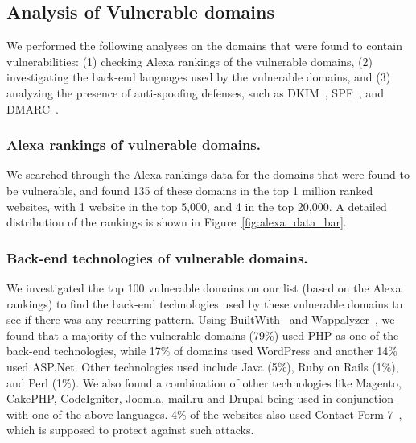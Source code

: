 
\subsection{Analysis of Vulnerable domains}


We performed the following analyses on the domains
that were found to contain \ehi vulnerabilities: (1) checking Alexa
rankings of the vulnerable domains, (2) investigating the back-end
languages used by the vulnerable domains, and (3) analyzing the presence
of anti-spoofing defenses, such as DKIM~\cite{allman2007domainkeys},
SPF~\cite{schlitt2006sender}, and DMARC~\cite{kucherawy2015domain}.



\subsubsection{Alexa rankings of vulnerable domains.}
We searched through the Alexa rankings data\cite{alexa} for the domains that were found to be vulnerable, and found 135 of these domains in the top 1 million ranked websites, with 1 website in the top 5,000, and 4 in the top 20,000. A detailed distribution of the rankings is shown in Figure~\ref{fig:alexa_data_bar}.



\subsubsection{Back-end technologies of vulnerable domains.}
We investigated the top 100 vulnerable domains on our list (based on the Alexa rankings) to find the back-end technologies used by these vulnerable domains to see if there was any recurring pattern. Using BuiltWith~\cite{builtwith} and Wappalyzer~\cite{wappalyzer}, we found that a majority of the vulnerable domains (79\%) used PHP as one of the back-end technologies, while 17\% of domains used WordPress and another 14\% used ASP.Net. Other technologies used include Java (5\%), Ruby on Rails (1\%), and Perl (1\%). We also found a combination of other technologies like Magento, CakePHP, CodeIgniter, Joomla, mail.ru and Drupal being used in conjunction with one of the above languages. 4\% of the websites also used Contact Form 7~\cite{CF7}, which is supposed to protect against such attacks.

